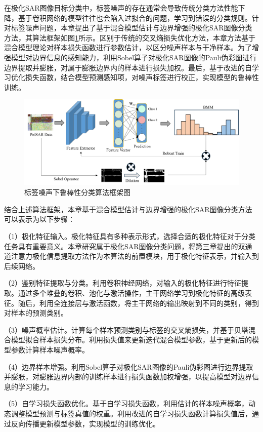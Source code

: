在极化SAR图像目标分类中，标签噪声的存在通常会导致传统分类方法性能下降，基于卷积网络的模型往往也会陷入过拟合的问题，学习到错误的分类规则。针对标签噪声问题，本章提出了基于混合模型估计与边界增强的极化SAR图像分类方法，其算法框架如图\ref{BBM_framework}所示。区别于传统的交叉熵损失优化方法，本章方法基于混合模型理论对样本损失函数进行参数估计，以区分噪声样本与干净样本。为了增强模型对边界信息的感知能力，利用Sobel算子对极化SAR图像的Pauli伪彩图进行边界提取并膨胀，对属于膨胀边界内的样本进行损失加权。最后，基于改进的自学习优化损失函数，结合模型预测感知项，对噪声标签进行校正，实现模型的鲁棒性训练。

\begin{figure}[h]
    \centering
    \includegraphics[width=14cm]{pic/chapter4/framework.png}
    \caption{标签噪声下鲁棒性分类算法框架图}
    \label{BBM_framework}
\end{figure}

结合上述算法框架，本章基于混合模型估计与边界增强的极化SAR图像分类方法可以表示为以下步骤：

（1）极化特征输入。极化特征具有多种表示形式，选择合适的极化特征对于分类任务具有重要意义。本章研究属于极化SAR图像分类问题，将第三章提出的双通道注意力极化信息提取方法作为本算法的前置模块，用于极化特征表示，并输入到后续网络。

（2）鉴别特征提取与分类。利用卷积神经网络，对输入的极化特征进行特征提取。通过多个堆叠的卷积、池化与激活操作，主干网络学习到极化特征的高级表征。随后，利用全连接层与激活函数，将主干网络的输出映射到不同的类别，得到对样本的预测类别。

（3）噪声概率估计。计算每个样本预测类别与标签的交叉熵损失，并基于贝塔混合模型拟合样本损失分布。利用损失值来更新迭代混合模型参数，基于更新后的模型参数计算样本噪声概率。

（4）边界样本增强。利用Sobel算子对极化SAR图像的Pauli伪彩图进行边界提取并膨胀，对膨胀边界内部的训练样本进行损失函数加权增强，以提高模型对边界信息的学习能力。

（5）自学习损失函数优化。基于自学习损失函数，利用估计的样本噪声概率，动态调整模型预测与标签真值的权重。利用改进的自学习损失函数计算损失值后，通过反向传播更新模型参数，实现模型的训练优化。


